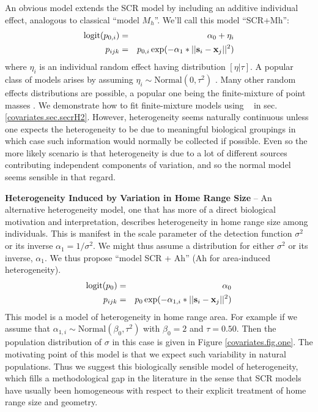 An obvious model extends the SCR model by including an additive
individual effect, analogous to classical ``model $M_{h}$''. We'll
call this model ``SCR+Mh'':
\begin{eqnarray*}
\mbox{logit}(p_{0,i})& =& \alpha_0 + \eta_{i} \\
p_{ijk}& = &p_{0,i} \exp(- \alpha_1*||{\bf s}_{i}-{\bf x}_{j}||^2)
\end{eqnarray*}
where $\eta_{i}$ is an individual random effect having distribution
$[\eta|\tau]$.  A popular class of models arises by assuming
$\eta_{i} \sim \mbox{Normal}(0,\tau^{2})$ \citep{coull_agresti:1999,
dorazio_royle:2003}.  Many other random effects
distributions are possible, a popular one being the finite-mixture of
point masses
\citep{norris_pollock:1996, pledger:2000}. 
We demonstrate how to fit 
finite-mixture models using \secr~ in sec. \ref{covariates.sec.secrH2}.  However, 
heterogeneity seems naturally continuous unless one expects the heterogeneity to be 
due to meaningful biological groupings in which case such information would normally 
be collected if possible.  Even so the more likely scenario is that heterogeneity 
is due to a lot of different sources contributing independent components of variation, 
and so the normal model seems sensible in that regard.  

{\bf Heterogeneity Induced by Variation in Home Range Size} -- An
alternative heterogeneity model, one that has more of a direct
biological motivation and interpretation, describes heterogeneity in
home range size among individuals. This is manifest in the scale
parameter of the detection function $\sigma^{2}$ or its inverse
$\alpha_1 = 1/\sigma^{2}$. We might thus assume a distribution for
either $\sigma^{2}$ or its inverse, $\alpha_1$.  We thus propose
``model SCR + Ah'' (Ah for area-induced heterogeneity).
\begin{eqnarray*}
\mbox{logit}(p_{0}) &=& \alpha_0   \\
p_{ijk} &=& p_{0} \exp(- \alpha_{1,i}*||{\bf s}_{i}-{\bf x}_{j}||^2)
\end{eqnarray*}
This model is a model of heterogeneity in home range area. For example
if we assume that $\alpha_{1,i} \sim \mbox{Normal}(\beta_0,\tau^{2})$
with $\beta_{0} = 2$ and $\tau = 0.50$. Then the population
distribution of $\sigma$ in this case is given in Figure
\ref{covariates.fig.one}. The motivating point of this model is that we expect
such variability in natural populations. Thus we suggest this
biologically sensible model of heterogeneity, which fills a
methodological gap in the literature in the sense that SCR models have
usually  been homogeneous with respect to their explicit treatment of home
range size and geometry.

